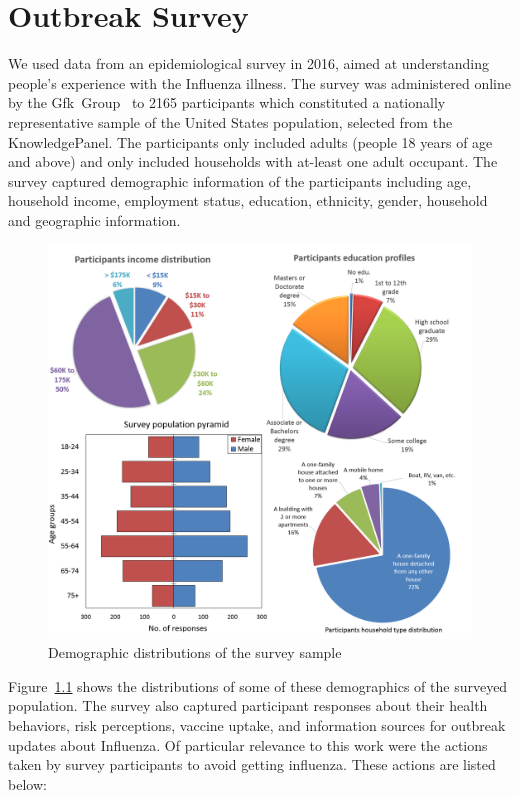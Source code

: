\documentclass[doublespace]{VTthesis}
\begin{document}
	\chapter{Outbreak Survey} \label{ch:survey}
	We used data from an epidemiological survey in 2016, aimed at understanding people's experience with the Influenza illness. The survey was administered online by the Gfk~Group~\cite{wiki:wikigfk} to 2165 participants which constituted a nationally representative sample of the United States population, selected from the KnowledgePanel\textregistered. The participants only included adults (people 18 years of age and above) and only included households with at-least one adult occupant. The survey captured demographic information of the participants including age, household income, employment status, education, ethnicity, gender, household and geographic information.
	\begin{figure}
    \centering
    \includegraphics[width=\textwidth]{figures/demographics.png}
    \caption{Demographic distributions of the survey sample}
    \label{fig:demog}
    \end{figure}
	Figure~\ref{fig:demog} shows the distributions of some of these demographics of the surveyed population. The survey also captured participant responses about their health behaviors, risk perceptions, vaccine uptake, and information sources for outbreak updates about Influenza. Of particular relevance to this work were the actions taken by survey participants to avoid getting influenza. These actions are listed below: 
\end{document}
